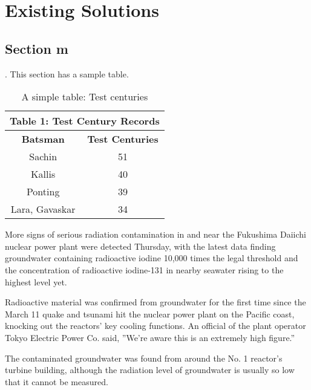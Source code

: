 %

\chapter{Existing Solutions}
\section{Section m}.
This section has a sample table. 

\begin{table}[htbp]		%
\begin{center}		
\begin{tabular}{ | c | c | }	%
\hline
\multicolumn{2}{|c|}{Table 1: Test Century Records }\\
\hline
\bf{Batsman} & \bf{Test Centuries}\\ \hline
Sachin & 51 \\ \hline
Kallis & 40 \\ \hline
Ponting & 39 \\ \hline
Lara, Gavaskar & 34\\ 
\hline
\end{tabular}
\caption{A simple table: Test centuries}	%
\label{table1}
\end{center}
\end{table}

More signs of serious radiation contamination in and near the Fukushima Daiichi nuclear power plant were detected Thursday, with the latest data finding groundwater containing radioactive iodine 10,000 times the legal threshold and the concentration of radioactive iodine-131 in nearby seawater rising to the highest level yet.

Radioactive material was confirmed from groundwater for the first time since the March 11 quake and tsunami hit the nuclear power plant on the Pacific coast, knocking out the reactors' key cooling functions. An official of the plant operator Tokyo Electric Power Co. said, ''We're aware this is an extremely high figure.''

The contaminated groundwater was found from around the No. 1 reactor's turbine building, although the radiation level of groundwater is usually so low that it cannot be measured.

